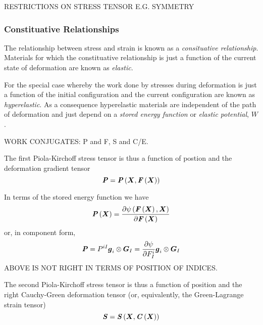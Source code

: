 RESTRICTIONS ON STRESS TENSOR E.G. SYMMETRY

\subsubsection{Constituative Relationships}

The relationship between stress and strain is known as a \emph{consituative
  relationship}. Materials for which the constituative relationship is just a
function of the current state of deformation are known as \emph{elastic}.


For the special case whereby the work done by stresses during deformation is
just a function of the initial configuration and the current configuration are
known as \emph{hyperelastic}. As a consequence hyperelastic materials are
independent of the path of deformation and just depend on a \emph{stored
  energy function} or \emph{elastic potential}, $W$.

WORK CONJUGATES: P and F, S and C/E.

The first Piola-Kirchoff stress tensor is thus a function of postion and the
deformation gradient tensor \ie
\begin{equation}
  \boldsymbol{\mathit{P}}= \boldsymbol{\mathit{P}}\left( \boldsymbol{X}, \boldsymbol{\mathit{F}}\left( \boldsymbol{X} \right)  \right) 
\end{equation}

In terms of the stored energy function we have
\begin{equation}
   \boldsymbol{\mathit{P}}\left( \boldsymbol{X} \right) = \dfrac{\partial  \psi\left(  \boldsymbol{\mathit{F}}\left( \boldsymbol{X} \right) ,\boldsymbol{X} \right) }{\partial  \boldsymbol{\mathit{F}}\left( \boldsymbol{X} \right) } 
\end{equation}
or, in component form,
\begin{equation}
  \boldsymbol{\mathit{P}}=P^{iI} \boldsymbol{g}_{i} \otimes \boldsymbol{G}_{I} = \dfrac{\partial \psi}{\partial F^{i}_{I}}  \boldsymbol{g}_{i} \otimes \boldsymbol{G}_{I} 
\end{equation}
ABOVE IS NOT RIGHT IN TERMS OF POSITION OF INDICES.

The second Piola-Kirchoff stress tensor is thus a function of position and
the right Cauchy-Green deformation tensor (or, equivalently, the
Green-Lagrange strain tensor) \ie
\begin{equation}
  \boldsymbol{\mathit{S}}= \boldsymbol{\mathit{S}}\left( \boldsymbol{X}, \boldsymbol{\mathit{C}}\left( \boldsymbol{X} \right)  \right) 
\end{equation}


